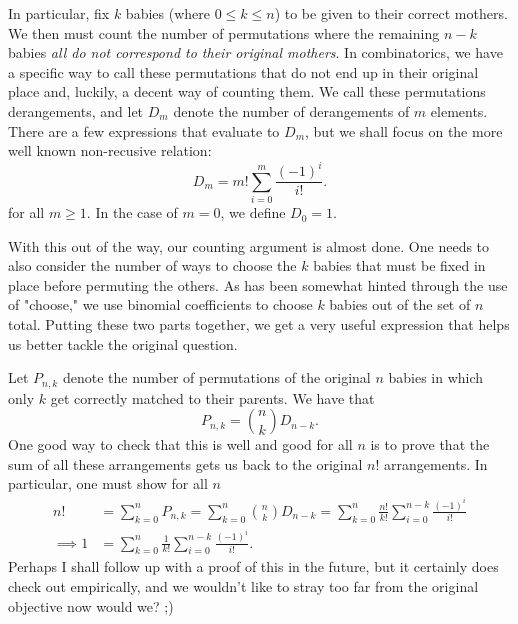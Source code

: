 In particular, fix \( k \) babies (where \( 0 \leqslant k \leqslant n \)) to be
given to their correct mothers. We then must count the number of permutations
where the remaining \( n - k \) babies \textit{all do not correspond to their
original mothers}. In combinatorics, we have a specific way to call these
permutations that do not end up in their original place and, luckily, a decent
way of counting them. We call these permutations derangements, and let \( D_m
\) denote the number of derangements of \( m \) elements. There are a few
expressions that evaluate to \( D_m \), but we shall focus on the more well
known non-recusive relation:
\[
    D_m = m! \sum_{i = 0}^{m} \frac{\left( -1 \right)^i}{i!}
.\]
for all \( m \geqslant 1 \). In the case of \( m = 0 \), we define \( D_0 = 1 \).

With this out of the way, our counting argument is almost done. One needs to
also consider the number of ways to choose the \( k \) babies that must be
fixed in place before permuting the others. As has been somewhat hinted through
the use of "choose," we use binomial coefficients to choose \( k \) babies out
of the set of \( n \) total. Putting these two parts together, we get a very
useful expression that helps us better tackle the original question.

Let \( P_{n,k} \) denote the number of permutations of the original \( n \)
babies in which only \( k \) get correctly matched to their parents. We have that
\[
    P_{n,k} = \binom{n}{k} D_{n - k}
.\]
One good way to check that this is well and good for all \( n \) is to prove
that the sum of all these arrangements gets us back to the original \( n! \)
arrangements. In particular, one must show for all \( n \)
\begin{align*}
    n! &= \sum_{k = 0}^{n} P_{n,k} = \sum_{k = 0}^{n} \binom{n}{k} D_{n - k} = \sum_{k = 0}^{n} \frac{n!}{k!} \sum_{i = 0}^{n - k} \frac{\left( -1 \right)^i}{i!} \\
    \implies 1 &= \sum_{k = 0}^{n} \frac{1}{k!} \sum_{i = 0}^{n - k} \frac{\left( -1 \right)^i}{i!}
.\end{align*}
Perhaps I shall follow up with a proof of this in the future,
 but it
certainly does check out empirically, and we wouldn't like to stray too far
from the original objective now would we? ;)

